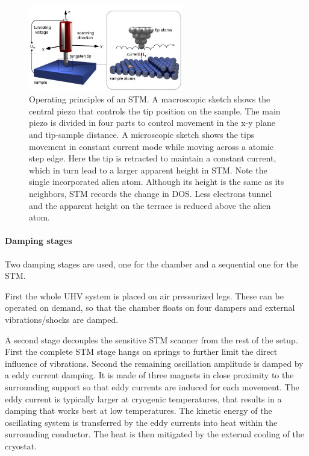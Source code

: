 \begin{figure}\centering
	
\includegraphics[width=0.6\textwidth]{./images/stm-rutgers-modified.jpg}
	\caption{Operating principles of an STM. A macroscopic sketch  shows the central piezo that controls the tip position on the sample. The main piezo is divided in four parts to control movement in the x-y plane and tip-sample distance. A microscopic sketch shows the tips movement in constant current mode while moving across a atomic step edge. Here the tip is retracted to maintain a constant current, which in turn lead to a larger apparent height in STM. Note the single incorporated alien atom. Although its height is the same as its neighbors, STM records the change in DOS. Less electrons tunnel and the apparent height on the terrace is reduced above the alien atom.\cite{STM-rutgers}}
\label{fig:STM-tip}
\end{figure}

\paragraph{Damping stages}
Two damping stages are used, one for the chamber and a sequential one for the STM.

First the whole UHV system is placed on air pressurized legs. These can be operated on demand, so that the chamber floats on four dampers and external vibrations/shocks are damped. 

A second stage decouples the sensitive STM scanner from the rest of the setup. First the complete STM stage hangs on springs to further limit the direct influence of vibrations. Second the remaining oscillation amplitude is damped by a eddy current damping. It is made of three magnets in close proximity to the surrounding support so that eddy currents are induced for each movement. The eddy current is typically larger at cryogenic temperatures, that results in a damping that works best at low temperatures. The kinetic energy of the oscillating system is transferred by the eddy currents into heat within the surrounding conductor. The heat is then mitigated by the external cooling of the cryostat.

